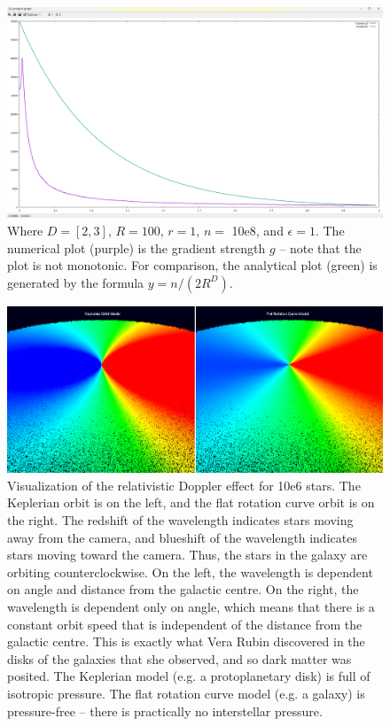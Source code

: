 \documentclass[12pt]{article}
\begin{document}
\begin{figure} 
\centering
\label{fig4}
  \includegraphics[width = 7 in]{numerical_versus_analytical.png}
  \caption{
Where $D = [2, 3]$, $R = 100$, $r = 1$, $n = $ 10e8, and $\epsilon = 1$.
The numerical plot (purple) is the gradient strength $g$ -- note that the plot is not monotonic.
For comparison, the analytical plot (green) is generated by the formula $y = n / (2 R^D)$.
}
\end{figure}


\begin{figure} 
\centering
\label{fig6}
  \includegraphics[width = 7 in]{doppler.png}
  \caption{
Visualization of the relativistic Doppler effect for 10e6 stars.
The Keplerian orbit is on the left, and the flat rotation curve orbit is on the right.
The redshift of the wavelength indicates stars moving away from the camera, and blueshift of the wavelength indicates stars moving toward the camera.
Thus, the stars in the galaxy are orbiting counterclockwise.
On the left, the wavelength is dependent on angle and distance from the galactic centre.
On the right, the wavelength is dependent only on angle, which means that there is a constant orbit speed that is independent of the distance from the galactic centre.
This is exactly what Vera Rubin discovered in the disks of the galaxies that she observed, and so dark matter was posited.
The Keplerian model (e.g. a protoplanetary disk) is full of isotropic pressure.
The flat rotation curve model (e.g. a galaxy) is pressure-free -- there is practically no interstellar pressure.
}
\end{figure}
\end{document}
